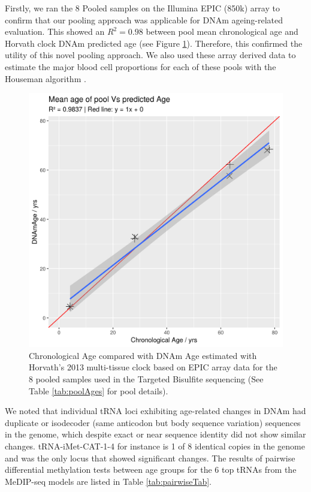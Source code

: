\documentclass[]{book}
\begin{document}
Firstly, we ran the 8 Pooled samples on the Illumina EPIC (850k) array to confirm that our pooling approach was applicable for DNAm ageing-related evaluation.
This showed an \(R^2 = 0.98\) between pool mean chronological age and Horvath clock DNAm predicted age \citep{Horvath2013}(see Figure \ref{fig:DNAmAgeVsChronAge}).
Therefore, this confirmed the utility of this novel pooling approach.
We also used these array derived data to estimate the major blood cell proportions for each of these pools with the Houseman algorithm \citep{Houseman2012}.

\begin{figure}

{\centering \includegraphics[width=0.6\linewidth]{./figs/DNAmAgeVsChronAge} 

}

\caption{Chronological Age compared with DNAm Age estimated with Horvath's 2013 multi-tissue clock \citep{Horvath2013} based on EPIC array data for the 8 pooled samples used in the Targeted Bisulfite sequencing (See Table \ref{tab:poolAges} for pool details).}\label{fig:DNAmAgeVsChronAge}
\end{figure}



We noted that individual tRNA loci exhibiting age-related changes in DNAm had duplicate or isodecoder (same anticodon but body sequence variation) sequences in the genome, which despite exact or near sequence identity did not show similar changes.
tRNA-iMet-CAT-1-4 for instance is 1 of 8 identical copies in the genome and was the only locus that showed significant changes.
The results of pairwise differential methylation tests between age groups for the 6 top tRNAs from the MeDIP-seq models are listed in Table \ref{tab:pairwiseTab}.
\end{document}
